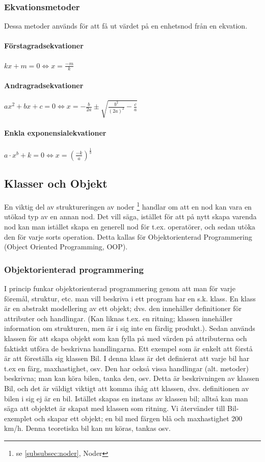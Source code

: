 \documentclass[12pt,a4paper]{article}
\begin{document}
\subsubsection{Ekvationsmetoder}
Dessa metoder används för att få ut värdet på en enhetsnod från en ekvation.
\label{subsubsec:Ekvationsmetoder}
\paragraph{Förstagradsekvationer}
\(kx+m=0\Leftrightarrow x=\frac{-m}{k}\)
\paragraph{Andragradsekvationer}
\(ax^{2}+bx+c=0\Leftrightarrow x=-\frac{b}{2a}\pm \sqrt{\frac{b^{2}}{(2a)^{2}}-\frac{c}{a}}\)
\paragraph{Enkla exponensialekvationer}
\(a\cdot x^{b}+k=0\Leftrightarrow x=(\frac{-k}{a})^{\frac{1}{b}}\)
\subsection{Klasser och Objekt}
\label{subsection:klasserochobjekt}
En viktig del av struktureringen av noder \footnote {se \ref{subsubsec:noder}, Noder} handlar om att en nod kan vara en utökad typ av en annan nod. Det vill säga, istället för att på nytt skapa varenda nod kan man istället skapa en generell nod för t.ex. operatörer, och sedan utöka den för varje sorts operation. Detta kallas för Objektorienterad Programmering (Object Oriented Programming, OOP). 
\subsubsection{Objektorienterad programmering}
\label{subsubsection:oop}
I princip funkar objektorienterad programmering genom att man för varje föremål, struktur, etc. man vill beskriva i ett program har en s.k. klass. En klass är en abstrakt modellering av ett objekt; dvs. den innehåller definitioner för attributer och handlingar. (Kan liknas t.ex. en ritning; klassen innehåller information om strukturen, men är i sig inte en färdig produkt.). Sedan används klassen för att skapa objekt som kan fylla på med värden på attributerna och faktiskt utföra de beskrivna handlingarna. Ett exempel som är enkelt att förstå är att föreställa sig klassen Bil. I denna klass är det definierat att varje bil har t.ex en färg, maxhastighet, osv. Den har också vissa handlingar (alt. metoder) beskrivna; man kan köra bilen, tanka den, osv. Detta är beskrivningen av klassen Bil, och det är väldigt viktigt att komma ihåg att klassen, dvs. definitionen av bilen i sig ej är en bil. Istället skapas en instans av klassen bil; alltså kan man säga att objektet är skapat med klassen som ritning. Vi återvänder till Bil-exemplet och skapar ett objekt; en bil med färgen blå och maxhastighet 200 km/h. Denna teoretiska bil kan nu köras, tankas osv.
\end{document}

